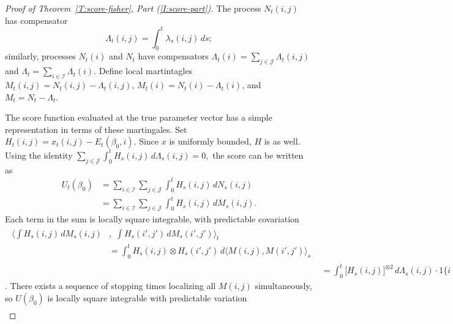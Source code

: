 \documentclass[aoas,preprint]{imsart}
\begin{document}
\begin{proof}[Proof of Theorem~\ref{T:score-fisher}, Part \textit{(\ref{I:score-part})}]
The process $N_t(i,j)$ has compensator
\begin{equation}
    \Lambda_t(i,j)
        =
            \int_0^t \lambda_s(i,j) \, ds;
\end{equation}
similarly, processes $N_t(i)$ and $N_t$ have compensators
$\Lambda_t(i) = \sum_{j \in \mathcal{J}} \Lambda_t(i,j)$
and $\Lambda_t = \sum_{i \in \mathcal{I}} \Lambda_t(i)$.  Define local
martintagles $M_t(i,j) = N_t(i,j) - \Lambda_t(i,j)$,
$M_t(i) = N_t(i) - \Lambda_t(i)$, and 
$M_t = N_t - \Lambda_t$.  

The score function evaluated at the true parameter vector has a simple
representation in terms of these martingales.  Set
$H_t(i,j) = x_t(i,j) - E_t(\beta_0,i)$.  Since $x$ is uniformly
bounded, $H$ is as well.  Using the identity
\(
    \sum_{j \in \mathcal{J}}
    \int_0^t
        H_s(i,j) \,
        d\Lambda_s(i,j)
    =
    0,
\)
the score can be written as
\begin{align*}
    U_t(\beta_0)
        &=
        \sum_{i \in \mathcal{I}}
        \sum_{j \in \mathcal{J}}
        \int_0^t
            H_s(i,j) \, dN_s(i,j) \\
        &=
        \sum_{i \in \mathcal{I}}
        \sum_{j \in \mathcal{J}}
        \int_0^t
            H_s(i,j) \, dM_s(i,j).
\end{align*}
Each term in the sum is locally square integrable, with predictable
covariation
\begin{align*}
    \begin{split}
        \bigg\langle
            \int
                H_s(i,j) \, dM_s(i,j)
        &, \, \,
            \int
                H_s(i',j') \, dM_s(i',j')
        \bigg\rangle_t \\
        &=
            \int_0^t
                H_s(i,j) \otimes H_s(i',j') \,
                d\big\langle M(i,j), M(i',j')\big\rangle_s
    \end{split} \\
        &=
            \int_0^t
                \big[ H_s(i,j) \big]^{\otimes 2} \,
                d\Lambda_s(i,j)
            \cdot
            1\{ i = i', j = j' \}
\end{align*}
\cite[Thm.~2.4.3]{fleming1991counting}.  There exists a sequence
of stopping times localizing all $M(i,j)$ simultaneously, so $U(\beta_0)$ is
locally square integrable with predictable variation
\begin{align}

\end{align}
\end{proof}
\end{document}
